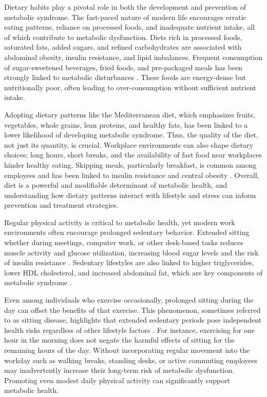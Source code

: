 \par Dietary habits play a pivotal role in both the development and prevention of metabolic syndrome. The fast-paced nature of modern life encourages erratic eating patterns, reliance on processed foods, and inadequate nutrient intake, all of which contribute to metabolic dysfunction. Diets rich in processed foods, saturated fats, added sugars, and refined carbohydrates are associated with abdominal obesity, insulin resistance, and lipid imbalances. Frequent consumption of sugar-sweetened beverages, fried foods, and pre-packaged meals has been strongly linked to metabolic disturbances \citep{mozaffarian2011changes}. These foods are energy-dense but nutritionally poor, often leading to over-consumption without sufficient nutrient intake.

\par Adopting dietary patterns like the Mediterranean diet, which emphasizes fruits, vegetables, whole grains, lean proteins, and healthy fats, has been linked to a lower likelihood of developing metabolic syndrome\citep{esposito2013mediterranean}. Thus, the quality of the diet, not just its quantity, is crucial. Workplace environments can also shape dietary choices; long hours, short breaks, and the availability of fast food near workplaces hinder healthy eating. Skipping meals, particularly breakfast, is common among employees and has been linked to insulin resistance and central obesity \citep{smith2017mcdonalds}. Overall, diet is a powerful and modifiable determinant of metabolic health, and understanding how dietary patterns interact with lifestyle and stress can inform prevention and treatment strategies.

\par Regular physical activity is critical to metabolic health, yet modern work environments often encourage prolonged sedentary behavior. Extended sitting whether during meetings, computer work, or other desk-based tasks reduces muscle activity and glucose utilization, increasing blood sugar levels and the risk of insulin resistance \citep{booth2012lack}. Sedentary lifestyles are also linked to higher triglycerides, lower HDL cholesterol, and increased abdominal fat, which are key components of metabolic syndrome \citep{hamilton2007too}.

\par Even among individuals who exercise occasionally, prolonged sitting during the day can offset the benefits of that exercise. This phenomenon, sometimes referred to as sitting disease, highlights that extended sedentary periods pose independent health risks regardless of other lifestyle factors \citep{owen2010too}. For instance, exercising for one hour in the morning does not negate the harmful effects of sitting for the remaining hours of the day. Without incorporating regular movement into the workday such as walking breaks, standing desks, or active commuting employees may inadvertently increase their long-term risk of metabolic dysfunction. Promoting even modest daily physical activity can significantly support metabolic health.

